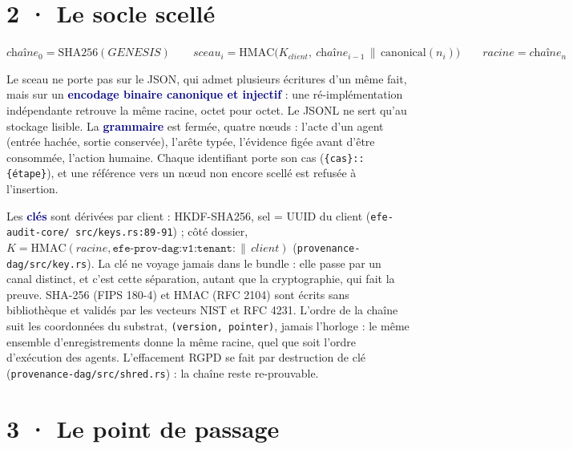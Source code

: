 \documentclass[10pt]{extarticle}
\newcommand{\code}[1]{\texttt{\small #1}}
\newcommand{\loc}[1]{{\footnotesize\color{grey}\texttt{#1}}}
\newcommand{\mm}[1]{\textbf{\textcolor{navy}{#1}}}
\begin{document}
\section{2 · Le socle scellé}

\begin{extrait}
\centering
$\textit{chaîne}_0 = \mathrm{SHA256}(\textit{GENESIS}) \qquad
\textit{sceau}_i = \mathrm{HMAC}\bigl(K_{\textit{client}},\ \textit{chaîne}_{i-1} \,\|\, \mathrm{canonical}(n_i)\bigr)
\qquad \textit{racine} = \textit{chaîne}_n$
\end{extrait}

Le sceau ne porte pas sur le JSON, qui admet plusieurs écritures d'un même fait, mais sur un \mm{encodage binaire
canonique et injectif} : une ré-implémentation indépendante retrouve la même racine, octet pour octet. Le JSONL ne
sert qu'au stockage lisible. La \mm{grammaire} est fermée, quatre nœuds : l'acte d'un agent (entrée hachée, sortie
conservée), l'arête typée, l'évidence figée avant d'être consommée, l'action humaine. Chaque identifiant porte son cas
(\code{\{cas\}::\{étape\}}), et une référence vers un nœud non encore scellé est refusée à l'insertion.

Les \mm{clés} sont dérivées par client : HKDF-SHA256, sel = UUID du client (\loc{efe-audit-core/\allowbreak
src/\allowbreak keys.rs:89-91}) ; côté dossier, $K = \mathrm{HMAC}(\textit{racine}, \texttt{efe-prov-dag:v1:tenant:}
\,\|\, \textit{client})$ (\loc{provenance-dag/\allowbreak src/\allowbreak key.rs}). La clé ne voyage jamais dans le
bundle : elle passe par un canal distinct, et c'est cette séparation, autant que la cryptographie, qui fait la preuve.
SHA-256 (FIPS 180-4) et HMAC (RFC 2104) sont écrits sans bibliothèque et validés par les vecteurs NIST et RFC 4231.
L'ordre de la chaîne suit les coordonnées du substrat, \code{(version, pointer)}, jamais l'horloge : le même ensemble
d'enregistrements donne la même racine, quel que soit l'ordre d'exécution des agents. L'effacement RGPD se fait par
destruction de clé (\loc{provenance-dag/\allowbreak src/\allowbreak shred.rs}) : la chaîne reste re-prouvable.

\section{3 · Le point de passage}
\end{document}
